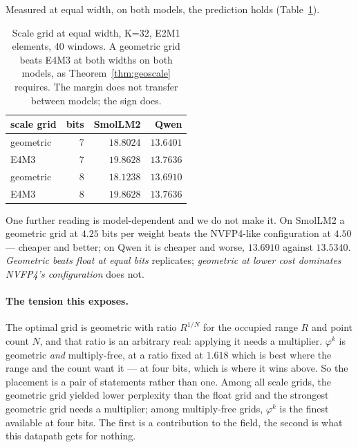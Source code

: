 \documentclass[11pt]{article}
\theoremstyle{definition}
\begin{document}
Measured at equal width, on both models, the prediction holds
(Table~\ref{tab:geoscale}).

\begin{table}[t]\centering
\caption{Scale grid at equal width, K=32, E2M1 elements, 40 windows. A
geometric grid beats E4M3 at both widths on both models, as
Theorem~\ref{thm:geoscale} requires. The margin does not transfer between
models; the sign does.}
\label{tab:geoscale}
\begin{tabular}{lrrr}
\toprule
scale grid & bits & SmolLM2 & Qwen \\
\midrule
geometric & 7 & $\mathbf{18.8024}$ & $\mathbf{13.6401}$ \\
E4M3      & 7 & $19.8628$ & $13.7636$ \\
\addlinespace
geometric & 8 & $\mathbf{18.1238}$ & $\mathbf{13.6910}$ \\
E4M3      & 8 & $19.8628$ & $13.7636$ \\
\bottomrule
\end{tabular}
\end{table}

One further reading is model-dependent and we do not make it. On SmolLM2 a
geometric grid at $4.25$ bits per weight beats the NVFP4-like configuration at
$4.50$ --- cheaper and better; on Qwen it is cheaper and worse, $13.6910$
against $13.5340$. \emph{Geometric beats float at equal bits} replicates;
\emph{geometric at lower cost dominates NVFP4's configuration} does not.

\paragraph{The tension this exposes.} The optimal grid is geometric with ratio
$R^{1/N}$ for the occupied range $R$ and point count $N$, and that ratio is an
arbitrary real: applying it needs a multiplier. $\varphi^{k}$ is geometric
\emph{and} multiply-free, at a ratio fixed at $1.618$ which is best where the
range and the count want it --- at four bits, which is where it wins above. So
the placement is a pair of statements rather than one. Among all scale grids,
the geometric grid yielded lower perplexity than the float grid and the strongest
geometric grid needs a multiplier; among
multiply-free grids, $\varphi^{k}$ is the finest available at four bits. The
first is a contribution to the field, the second is what this datapath gets for
nothing.
\end{document}

